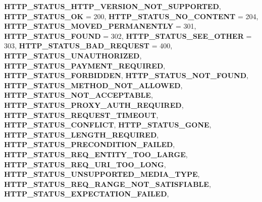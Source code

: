 \begin{DoxyCompactItemize}
{\bfseries H\+T\+T\+P\+\_\+\+S\+T\+A\+T\+U\+S\+\_\+\+H\+T\+T\+P\+\_\+\+V\+E\+R\+S\+I\+O\+N\+\_\+\+N\+O\+T\+\_\+\+S\+U\+P\+P\+O\+R\+T\+ED}, 
{\bfseries H\+T\+T\+P\+\_\+\+S\+T\+A\+T\+U\+S\+\_\+\+OK} = 200, 
\newline
{\bfseries H\+T\+T\+P\+\_\+\+S\+T\+A\+T\+U\+S\+\_\+\+N\+O\+\_\+\+C\+O\+N\+T\+E\+NT} = 204, 
{\bfseries H\+T\+T\+P\+\_\+\+S\+T\+A\+T\+U\+S\+\_\+\+M\+O\+V\+E\+D\+\_\+\+P\+E\+R\+M\+A\+N\+E\+N\+T\+LY} = 301, 
{\bfseries H\+T\+T\+P\+\_\+\+S\+T\+A\+T\+U\+S\+\_\+\+F\+O\+U\+ND} = 302, 
{\bfseries H\+T\+T\+P\+\_\+\+S\+T\+A\+T\+U\+S\+\_\+\+S\+E\+E\+\_\+\+O\+T\+H\+ER} = 303, 
\newline
{\bfseries H\+T\+T\+P\+\_\+\+S\+T\+A\+T\+U\+S\+\_\+\+B\+A\+D\+\_\+\+R\+E\+Q\+U\+E\+ST} = 400, 
{\bfseries H\+T\+T\+P\+\_\+\+S\+T\+A\+T\+U\+S\+\_\+\+U\+N\+A\+U\+T\+H\+O\+R\+I\+Z\+ED}, 
{\bfseries H\+T\+T\+P\+\_\+\+S\+T\+A\+T\+U\+S\+\_\+\+P\+A\+Y\+M\+E\+N\+T\+\_\+\+R\+E\+Q\+U\+I\+R\+ED}, 
{\bfseries H\+T\+T\+P\+\_\+\+S\+T\+A\+T\+U\+S\+\_\+\+F\+O\+R\+B\+I\+D\+D\+EN}, 
\newline
{\bfseries H\+T\+T\+P\+\_\+\+S\+T\+A\+T\+U\+S\+\_\+\+N\+O\+T\+\_\+\+F\+O\+U\+ND}, 
{\bfseries H\+T\+T\+P\+\_\+\+S\+T\+A\+T\+U\+S\+\_\+\+M\+E\+T\+H\+O\+D\+\_\+\+N\+O\+T\+\_\+\+A\+L\+L\+O\+W\+ED}, 
{\bfseries H\+T\+T\+P\+\_\+\+S\+T\+A\+T\+U\+S\+\_\+\+N\+O\+T\+\_\+\+A\+C\+C\+E\+P\+T\+A\+B\+LE}, 
{\bfseries H\+T\+T\+P\+\_\+\+S\+T\+A\+T\+U\+S\+\_\+\+P\+R\+O\+X\+Y\+\_\+\+A\+U\+T\+H\+\_\+\+R\+E\+Q\+U\+I\+R\+ED}, 
\newline
{\bfseries H\+T\+T\+P\+\_\+\+S\+T\+A\+T\+U\+S\+\_\+\+R\+E\+Q\+U\+E\+S\+T\+\_\+\+T\+I\+M\+E\+O\+UT}, 
{\bfseries H\+T\+T\+P\+\_\+\+S\+T\+A\+T\+U\+S\+\_\+\+C\+O\+N\+F\+L\+I\+CT}, 
{\bfseries H\+T\+T\+P\+\_\+\+S\+T\+A\+T\+U\+S\+\_\+\+G\+O\+NE}, 
{\bfseries H\+T\+T\+P\+\_\+\+S\+T\+A\+T\+U\+S\+\_\+\+L\+E\+N\+G\+T\+H\+\_\+\+R\+E\+Q\+U\+I\+R\+ED}, 
\newline
{\bfseries H\+T\+T\+P\+\_\+\+S\+T\+A\+T\+U\+S\+\_\+\+P\+R\+E\+C\+O\+N\+D\+I\+T\+I\+O\+N\+\_\+\+F\+A\+I\+L\+ED}, 
{\bfseries H\+T\+T\+P\+\_\+\+S\+T\+A\+T\+U\+S\+\_\+\+R\+E\+Q\+\_\+\+E\+N\+T\+I\+T\+Y\+\_\+\+T\+O\+O\+\_\+\+L\+A\+R\+GE}, 
{\bfseries H\+T\+T\+P\+\_\+\+S\+T\+A\+T\+U\+S\+\_\+\+R\+E\+Q\+\_\+\+U\+R\+I\+\_\+\+T\+O\+O\+\_\+\+L\+O\+NG}, 
{\bfseries H\+T\+T\+P\+\_\+\+S\+T\+A\+T\+U\+S\+\_\+\+U\+N\+S\+U\+P\+P\+O\+R\+T\+E\+D\+\_\+\+M\+E\+D\+I\+A\+\_\+\+T\+Y\+PE}, 
\newline
{\bfseries H\+T\+T\+P\+\_\+\+S\+T\+A\+T\+U\+S\+\_\+\+R\+E\+Q\+\_\+\+R\+A\+N\+G\+E\+\_\+\+N\+O\+T\+\_\+\+S\+A\+T\+I\+S\+F\+I\+A\+B\+LE}, 
{\bfseries H\+T\+T\+P\+\_\+\+S\+T\+A\+T\+U\+S\+\_\+\+E\+X\+P\+E\+C\+T\+A\+T\+I\+O\+N\+\_\+\+F\+A\+I\+L\+ED}, 

\end{DoxyCompactItemize}
